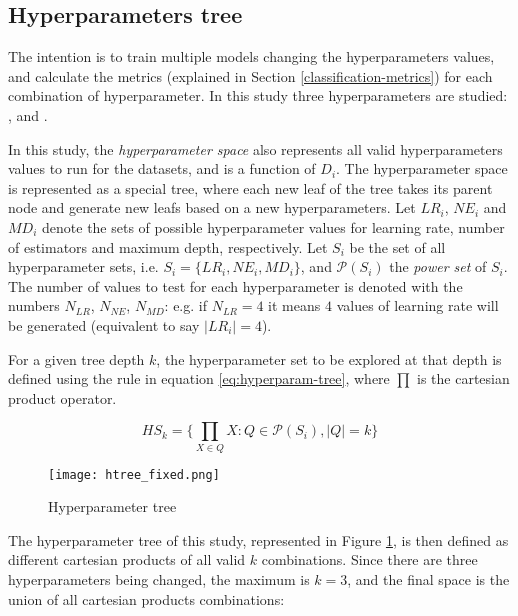 \subsection{Hyperparameters tree}
\label{subsec:hp-tree}

The intention is to train multiple models changing the hyperparameters values, and calculate the metrics (explained in Section \ref{classification-metrics}) for each combination of hyperparameter. In this study three hyperparameters are studied: \textbf{}, \textbf{} and \textbf{}.

In this study, the  \textit{hyperparameter space} also represents all valid hyperparameters values to run for the datasets, and is a function of $D_i$. The hyperparameter space is represented as a special tree, where each new leaf of the tree takes its parent node and generate new leafs based on a new hyperparameters. Let $LR_i$, $NE_i$ and $MD_i$ denote the sets of possible hyperparameter values for learning rate, number of estimators and maximum depth, respectively. Let $S_i$ be the set of all hyperparameter sets, i.e. $S_i = \{LR_i, NE_i, MD_i\}$, and $\mathcal{P}(S_i)$ the \textit{power set} of $S_i$. The number of values to test for each hyperparameter is denoted with the numbers $N_{LR}$, $N_{NE}$, $N_{MD}$: e.g. if $N_{LR} = 4$ it means $4$ values of learning rate will be generated (equivalent to say $|LR_i| = 4$).

For a given tree depth $k$, the hyperparameter set to be explored at that depth is defined using the rule in equation \ref{eq:hyperparam-tree}, where $\prod$ is the cartesian product operator.

\begin{equation}\label{eq:hyperparam-tree}
    HS_k = \Big\{\prod_{X \in Q} X : Q \in \mathcal{P}(S_i), |Q| = k\Big\}
\end{equation}


\begin{figure}[!h]
    \centering
    \texttt{[image: htree\_fixed.png]} 
    \caption{Hyperparameter tree}
    \label{fig:hp-tree}
\end{figure}

The hyperparameter tree of this study, represented in Figure \ref{fig:hp-tree}, is then defined as different cartesian products of all valid $k$ combinations. Since there are three hyperparameters being changed, the maximum is $k=3$, and the final space is the union of all cartesian products combinations:


